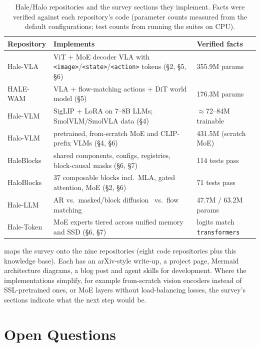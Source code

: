 \documentclass[11pt]{article}
\begin{document}
\begin{table}[t]
\centering
\caption{Hale/Halo repositories and the survey sections they implement. Facts were verified
against each repository's code (parameter counts measured from the default configurations;
test counts from running the suites on CPU).}
\label{tab:eco}
\small
\begin{tabular}{p{2.5cm}p{6.2cm}p{5.0cm}}
\toprule
Repository & Implements & Verified facts \\
\midrule
Hale-VLA & ViT + MoE decoder VLA with \texttt{<image>}/\texttt{<state>}/\texttt{<action>} tokens (\S2, \S5, \S6) & 355.9M params \\
HALE-WAM & VLA + flow-matching actions + DiT world model (\S5) & 176.3M params \\
Hale-VLM & SigLIP + LoRA on 7--8B LLMs; SmolVLM/SmolVLA data (\S4) & $\approx$72--84M trainable \\
Halo-VLM & pretrained, from-scratch MoE and CLIP-prefix VLMs (\S4, \S6) & 431.5M (scratch MoE) \\
HaleBlocks & shared components, configs, registries, block-causal masks (\S6, \S7) & 114 tests pass \\
HaloBlocks & 37 composable blocks incl.\ MLA, gated attention, MoE (\S2, \S6) & 71 tests pass \\
Hale-LLM & AR vs.\ masked/block diffusion~\cite{sahoo2024mdlm,arriola2025bd3lm} vs.\ flow matching & 47.7M / 63.2M params \\
Hale-Token & MoE experts tiered across unified memory and SSD (\S6, \S7) & logits match \texttt{transformers} \\
\bottomrule
\end{tabular}
\end{table}

 maps the survey onto the nine repositories (eight code repositories plus this
knowledge base). Each has an arXiv-style write-up, a project page, Mermaid architecture
diagrams, a blog post and agent skills for development. Where the implementations
simplify, for example from-scratch vision encoders instead of SSL-pretrained ones, or
MoE layers without load-balancing losses, the survey's sections indicate what the next
step would be.

\section{Open Questions}
\end{document}

